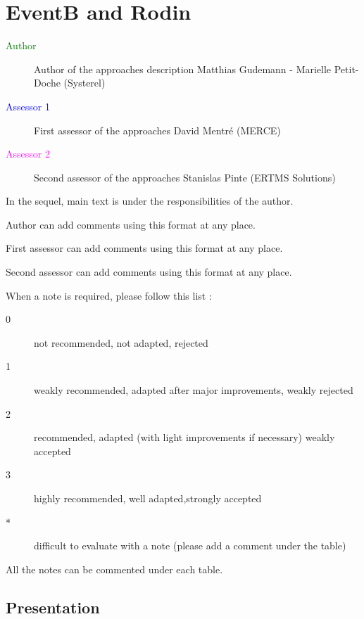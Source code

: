 \chapter{EventB and Rodin}

\begin{description}
\item[\textcolor{green}{Author}] Author of the approaches description  Matthias Gudemann - Marielle Petit-Doche (Systerel)
\item[\textcolor{blue}{Assessor 1}] First assessor of the approaches David Mentré (MERCE)
\item[\textcolor{magenta}{Assessor 2}] Second assessor of the approaches Stanislas Pinte (ERTMS Solutions)
\end{description}

In the sequel, main text is under the responsibilities of the author.

\begin{author_comment}
Author can add comments using this format at any place.
\end{author_comment}

\begin{assessor1}
First assessor can add comments using this format at any place.
\end{assessor1}

\begin{assessor2}
Second assessor can add comments using this format at any place.
\end{assessor2}

When a note is required, please follow this list :
\begin{description}
\item[0] not recommended, not adapted, rejected
\item[1] weakly recommended, adapted after major improvements, weakly rejected
\item[2] recommended, adapted (with light improvements if necessary)  weakly accepted
\item[3] highly recommended, well adapted,strongly accepted
\item[*] difficult to evaluate with a note (please add a comment under the table)
\end{description}

All the notes can be commented under each table.

\section{Presentation}

